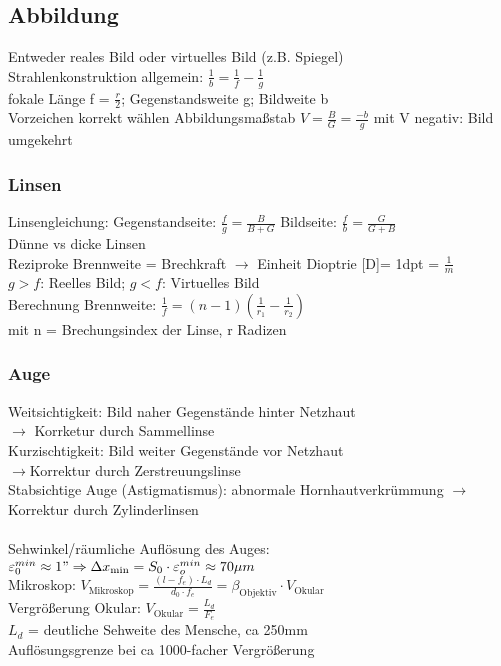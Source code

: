 \documentclass[fs, footer]{latex4ei}
\begin{document}
\begin{multicols*}{4}
\subsection{Abbildung}
Entweder reales Bild oder virtuelles Bild (z.B. Spiegel)\\
Strahlenkonstruktion allgemein: $\frac{1}{b}= \frac{1}{f} - \frac{1}{g}$\\
fokale Länge f = $\frac{r}{2}$; Gegenstandsweite g; Bildweite b\\
Vorzeichen korrekt wählen %
Abbildungsmaßstab $V = \frac{B}{G}=\frac{-b}{g}$ mit V negativ: Bild umgekehrt\\
\subsubsection{Linsen}
Linsengleichung:
Gegenstandseite: $\frac{f}{g} = \frac{B}{B+G}$
Bildseite: $\frac{f}{b}= \frac{G}{G+B}$\\
Dünne vs dicke Linsen\\ %
Reziproke Brennweite = Brechkraft $\rightarrow$ Einheit Dioptrie [D]= 1dpt = $\frac{1}{m}$\\
$g>f$: Reelles Bild;
$g<f$: Virtuelles Bild\\
Berechnung Brennweite: $\frac{1}{f}=(n-1)(\frac{1}{r_1}-\frac{1}{r_2})$\\
mit n = Brechungsindex der Linse, r Radizen
\subsubsection{Auge}
Weitsichtigkeit: Bild naher Gegenstände hinter Netzhaut\\
$\rightarrow$ Korrketur durch Sammellinse\\
Kurzischtigkeit: Bild weiter Gegenstände vor Netzhaut\\
$\rightarrow$Korrektur durch Zerstreuungslinse\\
Stabsichtige Auge (Astigmatismus): abnormale Hornhautverkrümmung $\rightarrow$Korrektur durch Zylinderlinsen\\
\\Sehwinkel/räumliche Auflösung des Auges: $\varepsilon_0^{min} \approx 1" \Rightarrow \Delta x_{\text{min}} = S_0\cdot\varepsilon_o^{min} \approx 70 \mu m$\\
Mikroskop: $V_{\text{Mikroskop}} = \frac{(l-f_e)\cdot L_d}{d_0\cdot f_e} = \beta_{\text{Objektiv}}\cdot V_{\text{Okular}}$\\
Vergrößerung Okular: $V_{\text{Okular}} = \frac{L_d}{F_e}$\\
$L_d$ = deutliche Sehweite des Mensche, ca 250mm\\
Auflösungsgrenze bei ca 1000-facher Vergrößerung\\


\end{multicols*}
\end{document}
